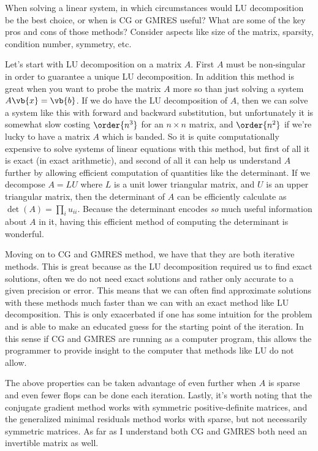 \documentclass[boxes,pages]{homework}
\begin{document}
\begin{problem}
When solving a linear system, in which circumstances would LU decomposition be the best choice, or when is CG or GMRES useful? What are some of the key pros and cons of those methods? Consider aspects like size of the matrix, sparsity, condition number, symmetry, etc.
\end{problem}

\begin{solution}
	Let's start with LU decomposition on a matrix $A$. First $A$ must be non-singular in order to guarantee a unique LU decomposition. In addition this method is great when you want to probe the matrix $A$ more so than just solving a system $A\vb{x} = \vb{b}$. If we do have the LU decomposition of $A$, then we can solve a system like this with forward and backward substitution, but unfortunately it is somewhat slow costing $\order{n^3}$ for an $n\times n$ matrix, and $\order{n^2}$ if we're lucky to have a matrix $A$ which is banded. So it is quite computationally expensive to solve systems of linear equations with this method, but first of all it is exact (in exact arithmetic), and second of all it can help us understand $A$ further by allowing efficient computation of quantities like the determinant. If we decompose $A = LU$ where $L$ is a unit lower triangular matrix, and $U$ is an upper triangular matrix, then the determinant of $A$ can be efficiently calculate as $\det(A) = \prod_iu_{ii}$. Because the determinant encodes \emph{so} much useful information about $A$ in it, having this efficient method of computing the determinant is wonderful.

	Moving on to CG and GMRES method, we have that they are both iterative methods. This is great because as the LU decomposition required us to find exact solutions, often we do not need exact solutions and rather only accurate to a given precision or error. This means that we can often find approximate solutions with these methods much faster than we can with an exact method like LU decomposition. This is only exacerbated if one has some intuition for the problem and is able to make an educated guess for the starting point of the iteration. In this sense if CG and GMRES are running as a computer program, this allows the programmer to provide insight to the computer that methods like LU do not allow.

	The above properties can be taken advantage of even further when $A$ is sparse and even fewer flops can be done each iteration. Lastly, it's worth noting that the conjugate gradient method works with symmetric positive-definite matrices, and the generalized minimal residuals method works with sparse, but not necessarily symmetric matrices. As far as I understand both CG and GMRES both need an invertible matrix as well.
\end{solution}
\end{document}
